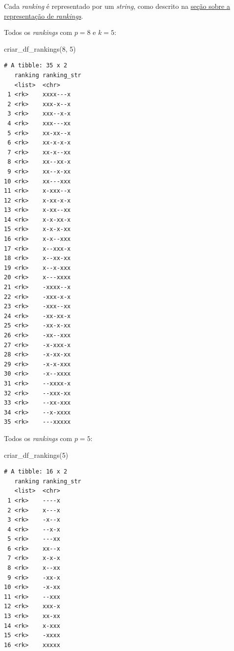 \documentclass[
  letterpaper,
  DIV=11,
  numbers=noendperiod]{scrreprt}
\newenvironment{Shaded}{\begin{snugshade}}{\end{snugshade}}
\newcommand{\DecValTok}[1]{\textcolor[rgb]{0.68,0.00,0.00}{#1}}
\newcommand{\FunctionTok}[1]{\textcolor[rgb]{0.28,0.35,0.67}{#1}}
\newcommand{\NormalTok}[1]{\textcolor[rgb]{0.00,0.23,0.31}{#1}}
\begin{document}
Cada \emph{ranking} é representado por um \emph{string}, como descrito
na \hyperref[sec-repr]{seção sobre a representação de \emph{rankings}}.

Todos os \emph{rankings} com $p = 8$ e $k = 5$:

\begin{Shaded}
\begin{Highlighting}[]
\FunctionTok{criar\_df\_rankings}\NormalTok{(}\DecValTok{8}\NormalTok{, }\DecValTok{5}\NormalTok{)}
\end{Highlighting}
\end{Shaded}

\begin{verbatim}
# A tibble: 35 x 2
   ranking ranking_str
   <list>  <chr>      
 1 <rk>    xxxx---x   
 2 <rk>    xxx-x--x   
 3 <rk>    xxx--x-x   
 4 <rk>    xxx---xx   
 5 <rk>    xx-xx--x   
 6 <rk>    xx-x-x-x   
 7 <rk>    xx-x--xx   
 8 <rk>    xx--xx-x   
 9 <rk>    xx--x-xx   
10 <rk>    xx---xxx   
11 <rk>    x-xxx--x   
12 <rk>    x-xx-x-x   
13 <rk>    x-xx--xx   
14 <rk>    x-x-xx-x   
15 <rk>    x-x-x-xx   
16 <rk>    x-x--xxx   
17 <rk>    x--xxx-x   
18 <rk>    x--xx-xx   
19 <rk>    x--x-xxx   
20 <rk>    x---xxxx   
21 <rk>    -xxxx--x   
22 <rk>    -xxx-x-x   
23 <rk>    -xxx--xx   
24 <rk>    -xx-xx-x   
25 <rk>    -xx-x-xx   
26 <rk>    -xx--xxx   
27 <rk>    -x-xxx-x   
28 <rk>    -x-xx-xx   
29 <rk>    -x-x-xxx   
30 <rk>    -x--xxxx   
31 <rk>    --xxxx-x   
32 <rk>    --xxx-xx   
33 <rk>    --xx-xxx   
34 <rk>    --x-xxxx   
35 <rk>    ---xxxxx   
\end{verbatim}

Todos os \emph{rankings} com $p = 5$:

\begin{Shaded}
\begin{Highlighting}[]
\FunctionTok{criar\_df\_rankings}\NormalTok{(}\DecValTok{5}\NormalTok{)}
\end{Highlighting}
\end{Shaded}

\begin{verbatim}
# A tibble: 16 x 2
   ranking ranking_str
   <list>  <chr>      
 1 <rk>    ----x      
 2 <rk>    x---x      
 3 <rk>    -x--x      
 4 <rk>    --x-x      
 5 <rk>    ---xx      
 6 <rk>    xx--x      
 7 <rk>    x-x-x      
 8 <rk>    x--xx      
 9 <rk>    -xx-x      
10 <rk>    -x-xx      
11 <rk>    --xxx      
12 <rk>    xxx-x      
13 <rk>    xx-xx      
14 <rk>    x-xxx      
15 <rk>    -xxxx      
16 <rk>    xxxxx      
\end{verbatim}
\end{document}
